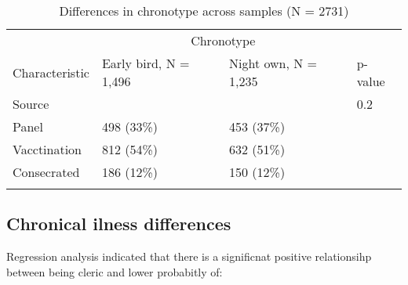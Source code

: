 \documentclass[ijerph,article,accept,moreauthors,pdftex]{mdpi}
\begin{document}
\begin{table}[!h]

\caption{\label{tab:contingenty tables}Differences in chronotype across samples (N = 2731)}
\centering
\begin{tabular}[t]{llll}
\toprule
\multicolumn{1}{c}{ } & \multicolumn{2}{c}{Chronotype} & \multicolumn{1}{c}{ } \\
\cmidrule(l{3pt}r{3pt}){2-3}{}
Characteristic & Early bird, N = 1,496 & Night own, N = 1,235 & p-value\\
\midrule{}
Source &  &  & 0.2\\
\hspace{1em}Panel & 498 (33\%) & 453 (37\%) & \\
\hspace{1em}Vacctination & 812 (54\%) & 632 (51\%) & \\
\hspace{1em}Consecrated & 186 (12\%) & 150 (12\%) & \\
\bottomrule{}
\end{tabular}
\end{table}

\hypertarget{chronical-ilness-differences}{%
\subsection{Chronical ilness
differences}\label{chronical-ilness-differences}}

Regression analysis indicated that there is a significnat positive
relationsihp between being cleric and lower probabitly of:
\end{document}

